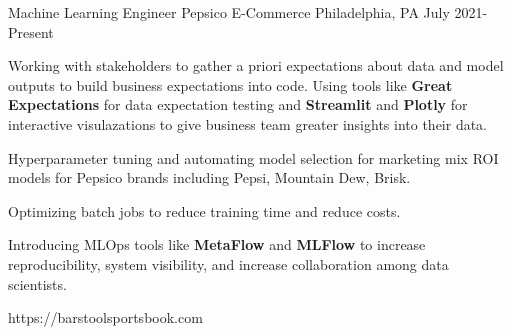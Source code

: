 
\begin{cventries}

\cventrylink
{Machine Learning Engineer}
{Pepsico E-Commerce}
{Philadelphia, PA}
{July 2021- Present}
{
\begin{cvitems}
\item{Working with stakeholders to gather a priori expectations about data and model outputs to build business expectations into code. Using tools like \textbf{Great Expectations} for data expectation testing and \textbf{Streamlit} and \textbf{Plotly} for interactive visulazations to give business team greater insights into their data.}
\item{Hyperparameter tuning and automating model selection for marketing mix ROI models for Pepsico brands including Pepsi, Mountain Dew, Brisk.}
\item{Optimizing batch jobs to reduce training time and reduce costs.}
\item{Introducing MLOps tools like \textbf{MetaFlow} and \textbf{MLFlow} to increase reproducibility, system visibility, and increase collaboration among data scientists.}
\end{cvitems}
}
{https://barstoolsportsbook.com}




\end{cventries}
